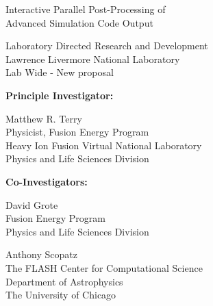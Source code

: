 \documentclass[letterpaper,11pt]{article}
\begin{document}
\begin{center}
	\LARGE
	\color{red}
	Interactive Parallel Post-Processing of \\
	Advanced Simulation Code Output
\end{center}

\vspace{0.5in}

\setlength{\parindent}{0pt}
\large
Laboratory Directed Research and Development \\
Lawrence Livermore National Laboratory \\
Lab Wide - New proposal

\normalsize
\begin{multicols}{2}
\textbf{Principle Investigator:}
\columnbreak

Matthew R. Terry \\
Physicist, Fusion Energy Program \\
Heavy Ion Fusion Virtual National Laboratory \\
Physics and Life Sciences Division

\end{multicols}


\textbf{Co-Investigators:}
\begin{multicols}{2}
	David Grote \\
	Fusion Energy Program \\
	Physics and Life Sciences Division\\
	\columnbreak
			
	Anthony Scopatz \\
	The FLASH Center for Computational Science \\
	Department of Astrophysics \\
	The University of Chicago \\
\end{multicols}



\end{document}
